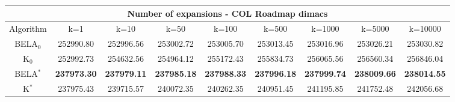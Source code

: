 \begin{tabular}{c|cccccccc}\toprule
\multicolumn{9}{c}{Number of expansions - COL Roadmap dimacs}\\ \midrule
Algorithm & k=1 & k=10 & k=50 & k=100 & k=500 & k=1000 & k=5000 & k=10000 \\ \midrule
BELA$_0$ & 252990.80 & 252996.56 & 253002.72 & 253005.70 & 253013.45 & 253016.96 & 253026.21 & 253030.82 \\
K$_0$ & 252992.73 & 254632.56 & 254964.12 & 255172.43 & 255834.73 & 256065.56 & 256560.34 & 256846.04 \\
BELA$^*$ & \textbf{237973.30} & \textbf{237979.11} & \textbf{237985.18} & \textbf{237988.33} & \textbf{237996.18} & \textbf{237999.74} & \textbf{238009.66} & \textbf{238014.55} \\
K$^*$ & 237975.43 & 239715.57 & 240072.35 & 240262.35 & 240951.45 & 241195.85 & 241752.48 & 242056.68 \\ \bottomrule 
\end{tabular}
